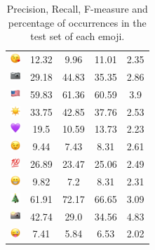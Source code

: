 \documentclass{article}
\begin{document}
\begin{table}
\begin{tabular}{|c|ccc|c|}
\includegraphics[height=0.37cm,width=0.37cm]{img/face_blowing_a_kiss.png} & 12.32 & 9.96 & 11.01 & 2.35\\ 
\includegraphics[height=0.37cm,width=0.37cm]{img/camera.png} & 29.18 & 44.83 & 35.35 & 2.86\\ 
\includegraphics[height=0.37cm,width=0.37cm]{img/United_States.png} & 59.83 & 61.36 & 60.59 & 3.9\\ 
\includegraphics[height=0.37cm,width=0.37cm]{img/sun.png} & 33.75 & 42.85 & 37.76 & 2.53\\ 
\includegraphics[height=0.37cm,width=0.37cm]{img/purple_heart.png} & 19.5 & 10.59 & 13.73 & 2.23\\ 
\includegraphics[height=0.37cm,width=0.37cm]{img/winking_face.png} & 9.44 & 7.43 & 8.31 & 2.61\\ 
\includegraphics[height=0.37cm,width=0.37cm]{img/hundred_points.png} & 26.89 & 23.47 & 25.06 & 2.49\\ 
\includegraphics[height=0.37cm,width=0.37cm]{img/beaming_face_with_smiling_eyes.png} & 9.82 & 7.2 & 8.31 & 2.31\\ 
\includegraphics[height=0.37cm,width=0.37cm]{img/Christmas_tree.png} & 61.91 & 72.17 & 66.65 & 3.09\\ 
\includegraphics[height=0.37cm,width=0.37cm]{img/camera_with_flash.png} & 42.74 & 29.0 & 34.56 & 4.83\\ 
\includegraphics[height=0.37cm,width=0.37cm]{img/winking_face_with_tongue.png} & 7.41 & 5.84 & 6.53 & 2.02\\ 

\hline
\end{tabular}
\caption{\label{table:emoji_detailed} Precision, Recall, F-measure and percentage of occurrences in the test set of each emoji.}
\end{table}
\end{document}
